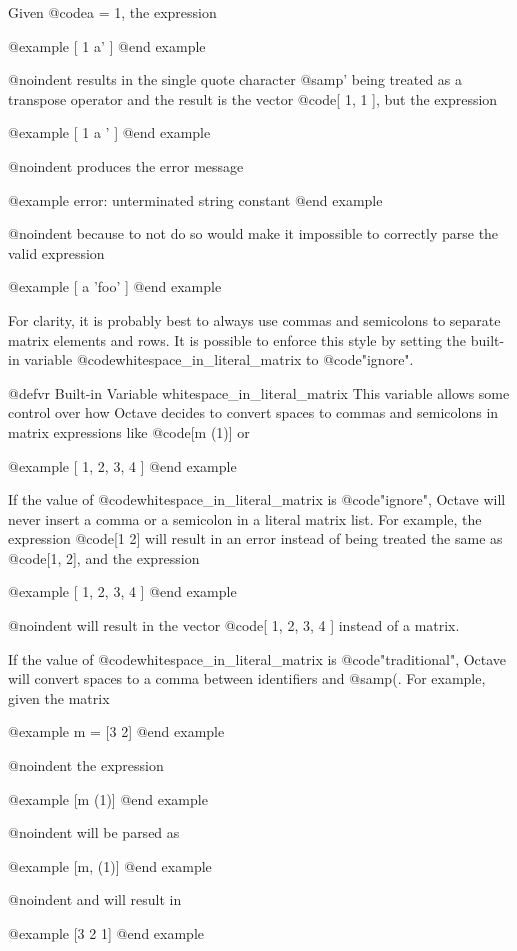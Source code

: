 Given @code{a = 1}, the expression

@example
[ 1 a' ]
@end example

@noindent
results in the single quote character @samp{'} being treated as a
transpose operator and the result is the vector @code{[ 1, 1 ]}, but the
expression

@example
[ 1 a ' ]
@end example

@noindent
produces the error message

@example
error: unterminated string constant
@end example

@noindent
because to not do so would make it impossible to correctly parse the
valid expression

@example
[ a 'foo' ]
@end example

For clarity, it is probably best to always use commas and semicolons to
separate matrix elements and rows.  It is possible to enforce this style
by setting the built-in variable @code{whitespace_in_literal_matrix} to
@code{"ignore"}.

@defvr {Built-in Variable} whitespace_in_literal_matrix
This variable allows some control over how Octave decides to convert
spaces to commas and semicolons in matrix expressions like
@code{[m (1)]} or

@example
[ 1, 2,
  3, 4 ]
@end example

If the value of @code{whitespace_in_literal_matrix} is @code{"ignore"},
Octave will never insert a comma or a semicolon in a literal matrix
list.  For example, the expression @code{[1 2]} will result in an error
instead of being treated the same as @code{[1, 2]}, and the expression

@example
[ 1, 2,
  3, 4 ]
@end example

@noindent
will result in the vector @code{[ 1, 2, 3, 4 ]} instead of a matrix.

If the value of @code{whitespace_in_literal_matrix} is @code{"traditional"},
Octave will convert spaces to a comma between identifiers and @samp{(}.  For
example, given the matrix

@example
m = [3 2]
@end example

@noindent
the expression

@example
[m (1)]
@end example

@noindent
will be parsed as

@example
[m, (1)]
@end example

@noindent
and will result in

@example
[3 2 1]
@end example

